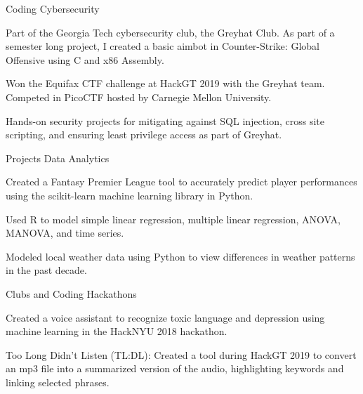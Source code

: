 \begin{cventries}
  \cventry
    {Coding}
    {Cybersecurity}
    {}
    {}
    {
      \begin{cvitems}
        \item {Part of the Georgia Tech cybersecurity club, the Greyhat Club. As part of a semester long project, I created a basic aimbot in Counter-Strike: Global Offensive using C and x86 Assembly.}
             \vspace{1mm}
        \item {Won the Equifax CTF challenge at HackGT 2019 with the Greyhat team. Competed in PicoCTF hosted by Carnegie Mellon University.}
             \vspace{1mm}
        \item {Hands-on security projects for mitigating against SQL injection, cross site scripting, and ensuring least privilege access as part of Greyhat.}
      \end{cvitems}
    }
  \vspace{-1mm}
  \cventry
    {Projects}
    {Data Analytics}
    {}
    {}
    {
      \begin{cvitems}
        \item {Created a Fantasy Premier League tool to accurately predict player performances using the scikit-learn machine learning library in Python.}
             \vspace{1mm}
        \item {Used R to model simple linear regression, multiple linear regression, ANOVA, MANOVA, and time series.}            \vspace{1mm}
        \item {Modeled local weather data using Python to view differences in weather patterns in the past decade.}
      \end{cvitems}
    }
    \vspace{-1mm}
  \cventry
    {Clubs and Coding}
    {Hackathons}
    {}
    {}
    {
      \begin{cvitems}
        \item {Created a voice assistant to recognize toxic language and depression using machine learning in the HackNYU 2018 hackathon.}
            \vspace{1mm}
        \item {Too Long Didn't Listen (TL:DL): Created a tool during HackGT 2019 to convert an mp3 file into a summarized version of the audio, highlighting keywords and linking selected phrases.}

\end{cvitems}}
\end{cventries}
